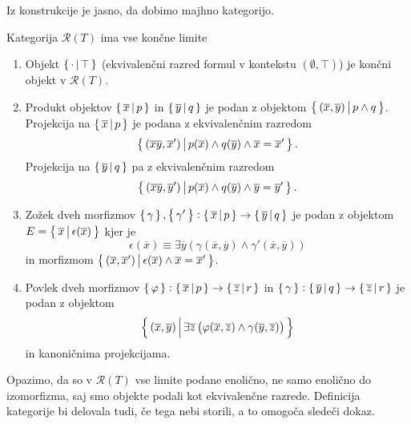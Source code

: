 \documentclass[../kategoricna_logika.tex]{subfiles}
\begin{document}
\noindent
Iz konstrukcije je jasno, da dobimo majhno kategorijo.
\begin{lema}
  Kategorija $\mathcal{R}(T)$ ima vse končne limite
  \begin{enumerate}[label=(\roman*)]
    \item Objekt $\left\lbrace\,\cdot \,\middle|\, \top\,\right\rbrace$ (ekvivalenčni razred formul v kontekstu $(\emptyset, \top)$) je končni objekt v $\mathcal{R}(T)$.
    \item Produkt objektov $\left\lbrace\,\overline{x}\,\middle|\, p\,\right\rbrace$ in $\left\lbrace\,\overline{y}\,\middle|\, q\,\right\rbrace$ je podan z objektom
      $\left\lbrace\,(\overline{x},\overline{y})\,\middle|\, p \wedge q\,\right\rbrace$.
      Projekcija na $\left\lbrace\,\overline{x}\,\middle|\, p\,\right\rbrace$ je podana z ekvivalenčnim  razredom 
      $$\left\lbrace\,(\overline{x}\overline{y},\overline{x}')\,\middle|\, p(\overline{x}) \wedge q(\overline{y}) \wedge \overline{x} = \overline{x}'\,\right\rbrace.$$
      Projekcija na $\left\lbrace\,\overline{y}\,\middle|\, q\,\right\rbrace$ pa z ekvivalenčnim razredom
      $$\left\lbrace\,(\overline{x}\overline{y},\overline{y}')\,\middle|\, p(\overline{x}) \wedge q(\overline{y}) \wedge \overline{y} = \overline{y}'\,\right\rbrace.$$
    \item Zožek dveh morfizmov $\left\lbrace\,\gamma\,\right\rbrace, \left\lbrace\,\gamma'\,\right\rbrace : \left\lbrace\,\overline{x}\,\middle|\, p\,\right\rbrace \to \left\lbrace\,\overline{y}\,\middle|\, q\,\right\rbrace$
      je podan z objektom $E = \left\lbrace\,\overline{x}\,\middle|\, \epsilon(\overline{x})\,\right\rbrace$ kjer je 
      $$\epsilon(\overline{x}) \equiv \exists \overline{y}\left(\gamma(\overline{x},\overline{y}) \wedge \gamma'(\overline{x},\overline{y})\right)$$
      in morfizmom $\left\lbrace\,(\overline{x},\overline{x}')\,\middle|\, \epsilon(\overline{x}) \wedge \overline{x} = \overline{x}'\,\right\rbrace$.
    \item Povlek dveh morfizmov $\left\lbrace\,\varphi\,\right\rbrace : \left\lbrace\,\overline{x}\,\middle|\, p\,\right\rbrace \to  \left\lbrace\,\overline{z}\,\middle|\, r\,\right\rbrace$ in $\left\lbrace\,\gamma\,\right\rbrace : \left\lbrace\,\overline{y}\,\middle|\, q\,\right\rbrace \to \left\lbrace\,\overline{z}\,\middle|\, r\,\right\rbrace$
      je podan z objektom 
      $$\left\lbrace\,(\overline{x},\overline{y})\,\middle|\, \exists \overline{z} \left(\varphi(\overline{x},\overline{z}) \wedge \gamma(\overline{y},\overline{z})\right)\,\right\rbrace$$
      in kanoničnima projekcijama.
  \end{enumerate}
\end{lema}
\begin{opomba}
  Opazimo, da so v $\mathcal{R}(T)$ vse limite podane enolično, ne samo enolično do izomorfizma,
  saj smo objekte podali kot ekvivalenčne razrede. Definicija kategorije bi delovala tudi, če tega nebi storili, a to omogoča sledeči dokaz.
\end{opomba}
\end{document}
